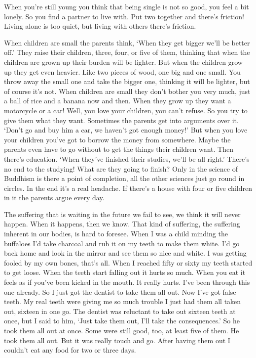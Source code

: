 When you're still young you think that being single is not so good, you feel a bit lonely. So you find a partner to live with. Put two together and there's friction! Living alone is too quiet, but living with others there's friction. 

When children are small the parents think, `When they get bigger we'll be better off.' They raise their children, three, four, or five of them, thinking that when the children are grown up their burden will be lighter. But when the children grow up they get even heavier. Like two pieces of wood, one big and one small. You throw away the small one and take the bigger one, thinking it will be lighter, but of course it's not. When children are small they don't bother you very much, just a ball of rice and a banana now and then. When they grow up they want a motorcycle or a car! Well, you love your children, you can't refuse. So you try to give them what they want. Sometimes the parents get into arguments over it. `Don't go and buy him a car, we haven't got enough money!' But when you love your children you've got to borrow the money from somewhere. Maybe the parents even have to go without to get the things their children want. Then there's education. `When they've finished their studies, we'll be all right.' There's no end to the studying! What are they going to finish? Only in the science of Buddhism is there a point of completion, all the other sciences just go round in circles. In the end it's a real headache. If there's a house with four or five children in it the parents argue every day. 

The suffering that is waiting in the future we fail to see, we think it will never happen. When it happens, then we know. That kind of suffering, the suffering inherent in our bodies, is hard to foresee. When I was a child minding the buffaloes I'd take charcoal and rub it on my teeth to make them white. I'd go back home and look in the mirror and see them so nice and white. I was getting fooled by my own bones, that's all. When I reached fifty or sixty my teeth started to get loose. When the teeth start falling out it hurts so much. When you eat it feels as if you've been kicked in the mouth. It really hurts. I've been through this one already. So I just got the dentist to take them all out. Now I've got false teeth. My real teeth were giving me so much trouble I just had them all taken out, sixteen in one go. The dentist was reluctant to take out sixteen teeth at once, but I said to him, `Just take them out, I'll take the consequences.' So he took them all out at once. Some were still good, too, at least five of them. He took them all out. But it was really touch and go. After having them out I couldn't eat any food for two or three days. 

